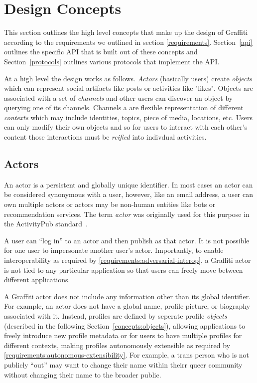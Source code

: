 \section{Design Concepts}

This section outlines the high level concepts that make up the design of Graffiti
according to the requirements we outlined in section \ref{requirements}.
Section~\ref{api} outlines the specific API that is built out of these
concepts and Section~\ref{protocols} outlines various protocols that implement the API.

At a high level the design works as follows.
\emph{Actors} (basically users) create \emph{objects} which can represent
social artifacts like posts or activities like "likes".
Objects are associated with a set of \emph{channels} and other users can
discover an object by querying one of its channels. Channels a are flexible representation
of different \emph{contexts} which may include identities, topics, piece of media, locations, etc.
Users can only modify their own objects and so for users to interact with each other's content
those interactions must be \emph{reified} into indivdual
activities.

\subsection{Actors}

An actor is a persistent and globally unique identifier.
In most cases an actor can be considered synonymous with a user,
however, like an email address, a user can own multiple actors
or actors may be non-human entities like bots or recommendation services.
The term \emph{actor} was originally used for this purpose
in the ActivityPub standard~\cite{activitypub}.

A user can ``log in'' to an actor and then publish as that actor.
It is not possible for one user to impersonate another user's actor.
Importantly, to enable interoperability
as required by \ref{requirements:adversarial-interop},
a Graffiti actor is not tied to any particular application so that users can freely move between
different applications.

A Graffiti actor does not include any information other than its
global identifier. For example, an actor does not have a global
name, profile picture, or biography associated with it.
Instead, profiles are defined by seperate profile \emph{objects}
(described in the following Section~\ref{concepts:objects}),
allowing applications to freely introduce new profile
metadata or for users to have multiple profiles for different contexts,
making profiles autonomously extensible as required by \ref{requirements:autonomous-extensibility}.
For example, a trans person who is not publicly ``out'' may want to
change their name within theirr queer community without
changing their name to the broader public.

